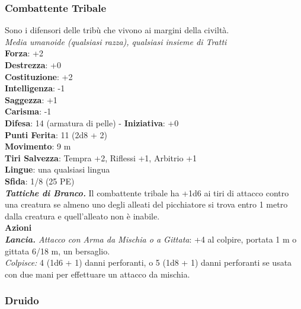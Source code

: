 \begin{multicols}{2}
\subsubsection{Combattente Tribale}
Sono i difensori delle tribù che vivono ai margini della civiltà.\\
\emph{Media umanoide (qualsiasi razza), qualsiasi insieme di Tratti}\\
\textbf{Forza}: +2\\
\textbf{Destrezza}: +0\\
\textbf{Costituzione}: +2\\
\textbf{Intelligenza}: -1\\
\textbf{Saggezza}: +1\\
\textbf{Carisma}: -1\\
\textbf{Difesa}: 14 (armatura di pelle) - \textbf{Iniziativa}: +0\\
\textbf{Punti Ferita}: 11 (2d8 + 2)\\
\textbf{Movimento}: 9 m\\
\textbf{Tiri Salvezza}: Tempra +2, Riflessi +1, Arbitrio +1 \\
\textbf{Lingue}: una qualsiasi lingua\\
\textbf{Sfida}: 1/8 (25 PE)\smallskip\\
\emph{\textbf{Tattiche di Branco.}} Il combattente tribale ha +1d6 ai tiri di attacco contro una creatura se almeno uno degli alleati del picchiatore si trova entro 1 metro dalla creatura e quell'alleato non è inabile.\\
\smallskip\textbf{Azioni}\\
\emph{\textbf{Lancia.} Attacco con Arma da Mischia o a Gittata}: +4 al colpire, portata 1 m o gittata 6/18 m, un bersaglio.\\
\emph{Colpisce:} 4 (1d6 + 1) danni perforanti, o 5 (1d8 + 1) danni perforanti se usata con due mani per effettuare un attacco da mischia.\\

\subsubsection{Druido}


\end{multicols}
